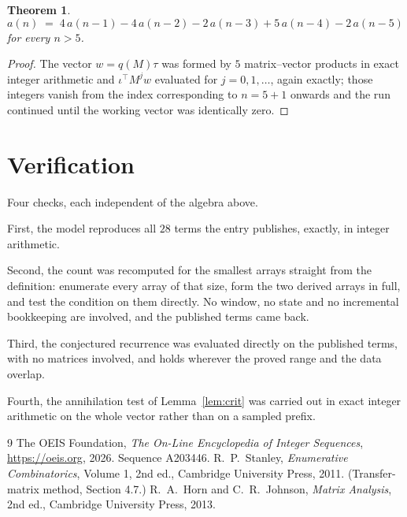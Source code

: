 \documentclass[11pt,a4paper]{article}
\theoremstyle{plain}
\newtheorem{theorem}{Theorem}
\theoremstyle{definition}
\begin{document}
\begin{theorem}
\[
a(n)\;=\;4\,a(n-1) - 4\,a(n-2) - 2\,a(n-3) + 5\,a(n-4) - 2\,a(n-5)
\]
for every $n>5$.
\end{theorem}

\begin{proof}
The vector $w=q(M)\tau$ was formed by $5$ matrix--vector products in exact integer
arithmetic and $\iota^{\!\top}M^{j}w$ evaluated for $j=0,1,\dots$, again exactly; those
integers vanish from the index corresponding to $n=5+1$ onwards and the run continued
until the working vector was identically zero.
\end{proof}

\section{Verification}

Four checks, each independent of the algebra above.

First, the model reproduces all $28$ terms the entry publishes, exactly, in integer
arithmetic.

Second, the count was recomputed for the smallest arrays straight from the definition:
enumerate every array of that size, form the two derived arrays in full, and test the condition
on them directly. No window, no state and no incremental bookkeeping are involved, and the
published terms came back.

Third, the conjectured recurrence was evaluated directly on the published terms, with no
matrices involved, and holds wherever the proved range and the data overlap.

Fourth, the annihilation test of Lemma~\ref{lem:crit} was carried out in exact integer
arithmetic on the whole vector rather than on a sampled prefix.

\begin{thebibliography}{9}
 The OEIS Foundation, \emph{The On-Line Encyclopedia of Integer
Sequences}, \url{https://oeis.org}, 2026. Sequence A203446.
 R.~P.~Stanley, \emph{Enumerative Combinatorics}, Volume 1, 2nd ed.,
Cambridge University Press, 2011. (Transfer-matrix method, Section 4.7.)
 R.~A.~Horn and C.~R.~Johnson, \emph{Matrix Analysis}, 2nd ed., Cambridge
University Press, 2013.
\end{thebibliography}
\end{document}
